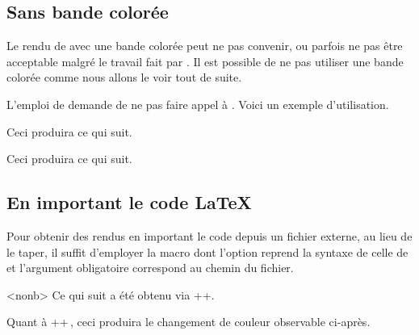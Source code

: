\subsection{Sans bande colorée}

Le rendu de  avec une bande colorée peut ne pas convenir, ou parfois ne pas être acceptable malgré le travail fait par .
Il est possible de ne pas utiliser une bande colorée comme nous allons le voir tout de suite.


\begin{tdocexa}
    L'emploi de  demande de ne pas faire appel à .
    Voici un exemple d'utilisation.



    Ceci produira ce qui suit.

    \medskip

    

\end{tdocexa}




\begin{tdocexa}
    \leavevmode



    Ceci produira ce qui suit.

    \medskip

    

\end{tdocexa}


\subsection{En important le code \LaTeX}

Pour obtenir des rendus en important le code depuis un fichier externe, au lieu de le taper, il suffit d'employer la macro  dont l'option reprend la syntaxe de celle de  et l'argument obligatoire correspond au chemin du fichier.


\begin{tdocexa}<nonb>
    Ce qui suit a été obtenu via \tdocinlatex++.

    \medskip



    \medskip

    Quant à \tdocinlatex++\,, ceci produira le changement de couleur observable ci-après.

    \medskip


\end{tdocexa}


